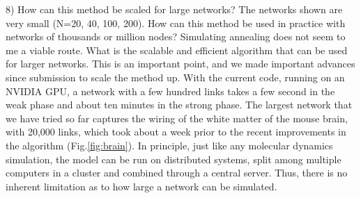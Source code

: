 \documentclass[11pt]{article}
\begin{document}
\begin{response}{
8) How can this method be scaled for large networks? The networks shown are very small (N=20, 40, 100, 200). How can this method be used in practice with networks of thousands or million nodes? Simulating annealing does not seem to me a viable route. What is the scalable and efficient algorithm that can be used for larger networks. 
}
This is an important point, and we made important advances since submission to scale the method up. 
With the current code, running on an NVIDIA GPU, a network with a few hundred links takes a few second in the weak phase and about ten minutes in the strong phase. 
The largest network that we have tried so far captures the wiring of the white matter of the mouse brain, with 20,000 links, which took about a week prior to the recent improvements in the algorithm (Fig.\ref{fig:brain}). 
In principle, just like any molecular dynamics simulation, the model can be run on distributed systems, split among multiple computers in a cluster and combined through a central server. 
Thus, there is no inherent limitation as to how large a network can be simulated. 


\end{response}
\end{document}
